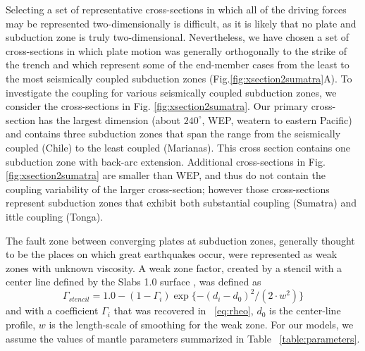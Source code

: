 \documentclass[12pt]{article}
\begin{document}
{Selecting a set of representative cross-sections in which all of the driving forces may be represented two-dimensionally is difficult, as it is likely that no plate and subduction zone is truly two-dimensional. 
Nevertheless, we have chosen a set of cross-sections in which plate motion was generally orthogonally to the strike of the trench and which represent some of the end-member cases from the least to the most seismically coupled subduction zones (Fig.\ref{fig:xsection2sumatra}A). To investigate the coupling for various seismically coupled subduction zones, we consider the cross-sections in Fig. \ref{fig:xsection2sumatra}. 
Our primary cross-section has the largest dimension (about $240^{\circ}$, WEP, weatern to eastern Pacific) and contains three subduction zones that span the range from the seismically coupled (Chile) to the least coupled (Marianas). This cross section contains one subduction zone with back-arc extension. Additional cross-sections in Fig.\ref{fig:xsection2sumatra} are smaller than WEP, and thus do not contain the coupling variability of the larger cross-section; however those cross-sections represent subduction zones that exhibit both substantial coupling (Sumatra) and ittle coupling (Tonga).




The fault zone between converging plates at subduction zones, generally thought to be the places on which great earthquakes occur, were represented as weak zones with unknown viscosity. 
A weak zone factor, created by a stencil with a center line defined by the Slabs 1.0 surface \citep{Hayes2012}, was defined as
\begin{equation}
\Gamma_{stencil} = 1.0 - (1-\Gamma_i)\exp\{-(d_i-d_0)^2/(2\cdot w^2)\}
\end{equation}
and with a coefficient $\Gamma_i$ that was recovered in ~\eqref{eq:rheo}, $d_0$ is the center-line profile, $w$ is the length-scale of smoothing for the weak zone.
 For our models, we assume the values of mantle parameters summarized in Table ~\ref{table:parameters}.

}
\end{document}

